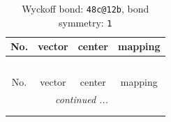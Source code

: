 \documentclass[fleqn,8pt]{jsarticle}
\begin{document}
\renewcommand{\arraystretch}{1.2}
\begin{longtable}{cccc}
\caption{Wyckoff bond: {\tt 48c@12b}, bond symmetry: {\tt 1}}
 \\
 \hline \hline
No. & vector & center & mapping \\ \hline \endfirsthead

\multicolumn{3}{l}{\tablename\ \thetable{}} \\
 \hline \hline
No. & vector & center & mapping \\ \hline \endhead

 \hline \hline
\multicolumn{3}{r}{\footnotesize\it continued ...} \\ \endfoot

 \hline \hline
\multicolumn{3}{r}{} \\ \endlastfoot


\end{longtable}
\end{document}

